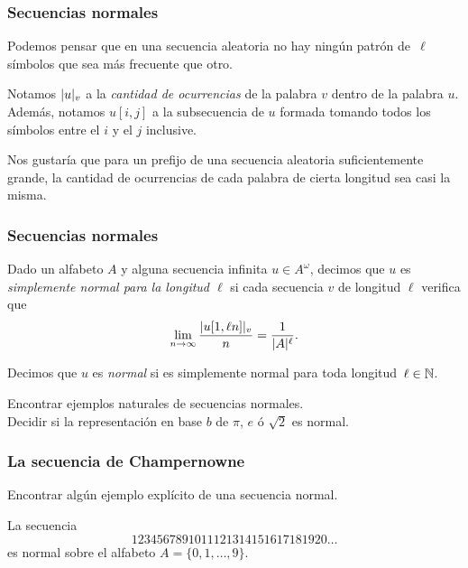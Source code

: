 \documentclass[10pt,mathserif]{beamer}%
\begin{document}
\begin{frame}
\frametitle{Secuencias normales}
Podemos pensar que en una secuencia aleatoria no hay ningún patrón de~$\ell$ símbolos que sea más frecuente que otro.\\
\pause
\begin{definition}
Notamos $|u|_{v}$ a la \textit{cantidad de ocurrencias} de la palabra $v$ dentro de la palabra $u$.\\
\pause
\medskip
Además, notamos $u[i,j]$ a la subsecuencia de $u$ formada tomando todos los símbolos entre el $i$ y el $j$ inclusive.
\end{definition}
\pause
\medskip
Nos gustaría que para un prefijo de una secuencia aleatoria suficientemente grande, 
la cantidad de ocurrencias de cada palabra de cierta longitud sea casi la misma.
\end{frame}


\begin{frame}
\frametitle{Secuencias normales}

\begin{definition}
Dado un alfabeto $A$ y alguna secuencia infinita $u \in A^{\omega}$, 
decimos que $u$ es \textit{simplemente normal para la longitud $\ell$} 
si cada secuencia $v$ de longitud 
\color{magenta}
$\ell$
\color{black} verifica que 
$$
\lim_{n \rightarrow \infty} \frac{|u[1,\ell n]|_{v}}{n} = \frac{1}{|A|^{\ell}}.
$$
\medskip
\pause

\medskip
Decimos que $u$ es \textit{normal} 
si es simplemente normal para toda longitud~$\ell \in \mathbb{N}$.
 \end{definition}
\pause

\begin{problem}
Encontrar ejemplos naturales de secuencias normales. \\
Decidir si la representación en base $b$ de $\pi$, $e$ ó $\sqrt{2}$ es normal.
\end{problem}
\end{frame}


\begin{frame}
\frametitle{La secuencia de Champernowne}

  \begin{problem}
  Encontrar algún ejemplo explícito de una secuencia normal.
  \end{problem}
  \pause
  \begin{theorem}
  La secuencia
  $$1234567891011121314151617181920\ldots$$
  es normal 
  sobre 
  el alfabeto $A = \{0, 1, \ldots, 9\}$.
  \end{theorem}
\end{frame}
\end{document}

